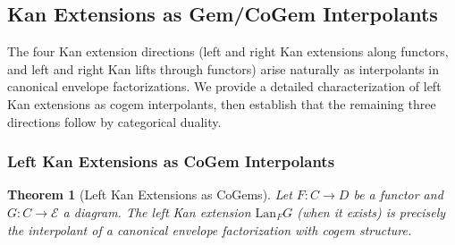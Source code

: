 \documentclass[11pt]{article}
\theoremstyle{plain}
\newtheorem{theorem}{Theorem}[section]
\theoremstyle{definition}
\theoremstyle{remark}
\begin{document}
\subsection{Kan Extensions as Gem/CoGem Interpolants}

The four Kan extension directions (left and right Kan extensions along functors, and left and right Kan lifts through functors) arise naturally as interpolants in canonical envelope factorizations. We provide a detailed characterization of left Kan extensions as cogem interpolants, then establish that the remaining three directions follow by categorical duality.

\subsubsection{Left Kan Extensions as CoGem Interpolants}

\begin{theorem}[Left Kan Extensions as CoGems]
\label{thm:lan-cogems}
Let $F : C \to D$ be a functor and $G : C \to \mathcal{E}$ a diagram. The left Kan extension $\mathrm{Lan}_F G$ (when it exists) is precisely the interpolant of a canonical envelope factorization with cogem structure.
\end{theorem}
\end{document}
